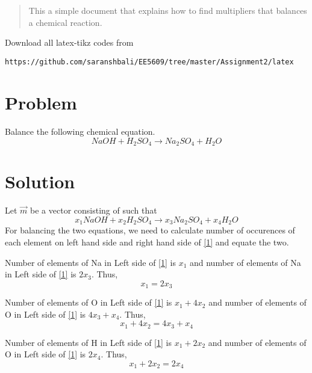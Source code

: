 \documentclass[journal,12pt,twocolumn]{IEEEtran}
\begin{document}
%
\begin{abstract}
This a simple document that explains how to find multipliers that balances a chemical reaction.
\end{abstract}
%
%
Download all latex-tikz codes from 
%
\begin{lstlisting}
https://github.com/saranshbali/EE5609/tree/master/Assignment2/latex
\end{lstlisting}
%
\section{Problem}
Balance the following chemical equation.
\begin{equation*}
NaOH + H_2SO_4 \xrightarrow{} Na_2SO_4  +  H_2O
\end{equation*}
\section{Solution}
Let $\vec{m}$ be a vector consisting of  such that
\begin{equation}\label{1}
 x_1NaOH + x_2H_2SO_4 \xrightarrow{} x_3Na_2SO_4  +  x_4H_2O
\end{equation}
For balancing the two equations, we need to calculate number of occurences of each element on left hand side and right hand side of \ref{1} and equate the two.

Number of elements of Na in Left side of \ref{1} is $x_1$ and number of elements of Na in Left side of \ref{1} is $2x_3$. Thus,
\begin{equation}\label{up1}
	x_1 = 2x_3
\end{equation}

Number of elements of O in Left side of \ref{1} is $x_1 + 4x_2$ and number of elements of O in Left side of \ref{1} is $4x_3 +x_4$. Thus,
\begin{equation}\label{up2}
	x_1 + 4x_2 = 4x_3 +x_4
\end{equation}

Number of elements of H in Left side of \ref{1} is $x_1 + 2x_2$ and number of elements of O in Left side of \ref{1} is $2x_4$. Thus,
\begin{equation}\label{up3}
	x_1 + 2x_2 = 2x_4
\end{equation}
\end{document}
